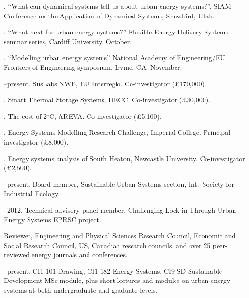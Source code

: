 \documentclass[11pt,a4paper]{article}
\begin{document}
. ``What can dynamical systems tell us about urban energy systems?''.  SIAM Conference on the Application of Dynamical Systems, Snowbird, Utah. 

. ``What next for urban energy systems?'' Flexible Energy Delivery Systems seminar series, Cardiff University. October.


. ``Modelling urban energy systems'' National Academy of Engineering/EU Frontiers of Engineering symposium, Irvine, CA. November.


\bigskip

\noindent{}%
%
%
--present.  SusLabs NWE, EU Interregio.  Co-investigator (£170,000).

. Smart Thermal Storage Systems, DECC.  Co-investigator (£30,000).

. The cost of 2$^\circ$C, AREVA.  Co-investigator (£5,100).

. Energy Systems Modelling Research Challenge, Imperial College.  Principal investigator (£8,000).

. Energy systems analysis of South Heaton, Newcastle University.  Co-investigator (£2,500).

\bigskip 

\noindent{}%
%
--present. Board member, Sustainable Urban Systems section, Int.\ Society for Industrial Ecology.

--2012. Technical advisory panel member, Challenging Lock-in Through Urban Energy Systems EPRSC project.


\ind Reviewer, Engineering and Physical Sciences Research Council, Economic and Social Research Council, US, Canadian research councils, and over 25 peer-reviewed energy journals and conferences.

\bigskip

\noindent{}%
%
--present.  CI{1-101} Drawing, CI{1-182} Energy Systems, CI{9-SD} Sustainable Development MSc module, plus short lectures and modules on urban energy systems at both undergraduate and graduate levels.
 
\end{document}
